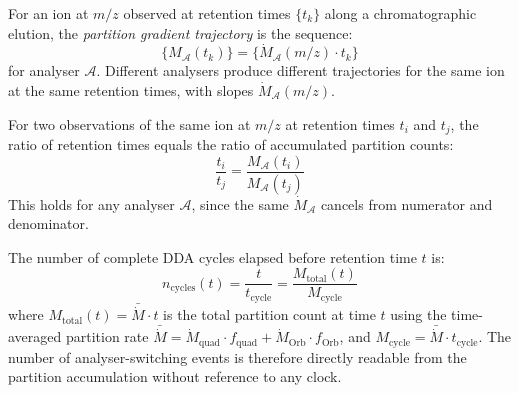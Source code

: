 \begin{definition}
\label{def:gradient_traj}
For an ion at $m/z$ observed at retention times $\{t_k\}$ along a
chromatographic elution, the \emph{partition gradient trajectory} is the sequence:
\begin{equation}
    \{M_{\mathcal{A}}(t_k)\} = \{\dot{M}_{\mathcal{A}}(m/z) \cdot t_k\}
    \label{eq:gradient_traj}
\end{equation}
for analyser $\mathcal{A}$. Different analysers produce different trajectories
for the same ion at the same retention times, with slopes $\dot{M}_{\mathcal{A}}(m/z)$.
\end{definition}

\begin{theorem}
\label{thm:rt_from_partition}
For two observations of the same ion at $m/z$ at retention times $t_i$ and
$t_j$, the ratio of retention times equals the ratio of accumulated partition
counts:
\begin{equation}
    \frac{t_i}{t_j} = \frac{M_{\mathcal{A}}(t_i)}{M_{\mathcal{A}}(t_j)}
    \label{eq:rt_ratio}
\end{equation}
This holds for any analyser $\mathcal{A}$, since the same $\dot{M}_{\mathcal{A}}$
cancels from numerator and denominator.
\end{theorem}

\begin{corollary}
\label{cor:dda_cycles}
The number of complete DDA cycles elapsed before retention time $t$ is:
\begin{equation}
    n_{\mathrm{cycles}}(t) = \frac{t}{t_{\mathrm{cycle}}} =
    \frac{M_{\mathrm{total}}(t)}{M_{\mathrm{cycle}}}
    \label{eq:dda_cycles}
\end{equation}
where $M_{\mathrm{total}}(t) = \bar{\dot{M}} \cdot t$ is the total partition
count at time $t$ using the time-averaged partition rate $\bar{\dot{M}} =
\dot{M}_{\mathrm{quad}} \cdot f_{\mathrm{quad}} + \dot{M}_{\mathrm{Orb}} \cdot
f_{\mathrm{Orb}}$, and $M_{\mathrm{cycle}} = \bar{\dot{M}} \cdot t_{\mathrm{cycle}}$.
The number of analyser-switching events is therefore directly readable from the
partition accumulation without reference to any clock.
\end{corollary}
